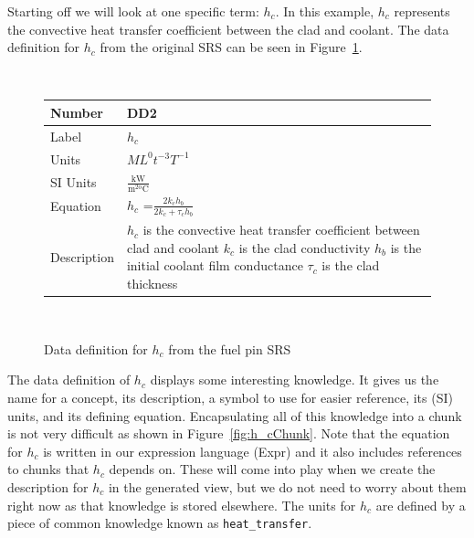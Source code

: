 \documentclass[preprint, 10pt]{sigplanconf}
\newcommand{\colAwidth}{0.1\textwidth}
\newcommand{\colBwidth}{0.34\textwidth}
\begin{document}
Starting off we will look at one specific term: $h_c$. In this example, $h_c$
represents the convective heat transfer coefficient between the clad and
coolant. The data definition for $h_c$ from the original SRS can be seen in
Figure~\ref{fig:h_c}.

\begin{figure}
~\newline \noindent \begin{minipage}{\textwidth}
\begin{tabular}{p{\colAwidth} p{\colBwidth}}
\toprule \textbf{Number} & \textbf{DD2 \label{hc}}
\\ \midrule 
Label & 
$h_{c}$
\\ \midrule
Units & $ML^0t^{-3}T^{-1}$\\ \midrule
SI Units & $\mathrm{\frac{kW}{m^{2o}C}}$\\ \midrule
Equation & $h_{c}$ =$
\frac{2k_{c}h_{b}}{2k_{c}+\tau_{c}h_{b}}$\\ \midrule
Description & $h_{c}$ is the convective heat transfer coefficient between clad
and coolant
\newline
$k_{c}$ is the
clad conductivity \newline
$h_{b}$ is the
initial coolant film conductance \newline
$\tau_{c}$ is the
clad thickness 
\newline
\end{tabular} \end{minipage}\\ 
\caption{Data definition for $h_c$ from the fuel pin SRS}
\label{fig:h_c}
\end{figure}

The data definition of $h_c$ displays some interesting knowledge. It gives us
the name for a concept, its description, a symbol to use for easier reference,
its (SI) units, and its defining equation. Encapsulating all of this knowledge
into a chunk is not very difficult as shown in Figure~\ref{fig:h_cChunk}. Note
that the equation for $h_c$ is written in our expression language (Expr) and it
also includes references to chunks that $h_c$ depends on. These will come into
play when we create the description for $h_c$ in the generated view, but we do
not need to worry about them right now as that knowledge is stored elsewhere.
The units for $h_c$ are defined by a piece of common knowledge known as
\verb|heat_transfer|.
\end{document}
